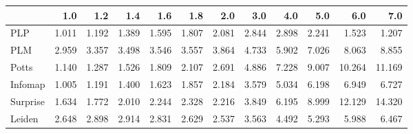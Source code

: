 \begin{tabular}{lrrrrrrrrrrr}
\toprule
{} &   1.0 &   1.2 &   1.4 &   1.6 &   1.8 &   2.0 &   3.0 &   4.0 &   5.0 &    6.0 &    7.0 \\
\midrule
PLP      & 1.011 & 1.192 & 1.389 & 1.595 & 1.807 & 2.081 & 2.844 & 2.898 & 2.241 &  1.523 &  1.207 \\
PLM      & 2.959 & 3.357 & 3.498 & 3.546 & 3.557 & 3.864 & 4.733 & 5.902 & 7.026 &  8.063 &  8.855 \\
Potts    & 1.140 & 1.287 & 1.526 & 1.809 & 2.107 & 2.691 & 4.886 & 7.228 & 9.007 & 10.264 & 11.169 \\
Infomap  & 1.005 & 1.191 & 1.400 & 1.623 & 1.857 & 2.184 & 3.579 & 5.034 & 6.198 &  6.949 &  6.727 \\
Surprise & 1.634 & 1.772 & 2.010 & 2.244 & 2.328 & 2.216 & 3.849 & 6.195 & 8.999 & 12.129 & 14.320 \\
Leiden   & 2.648 & 2.898 & 2.914 & 2.831 & 2.629 & 2.537 & 3.563 & 4.492 & 5.293 &  5.988 &  6.467 \\
\bottomrule
\end{tabular}
